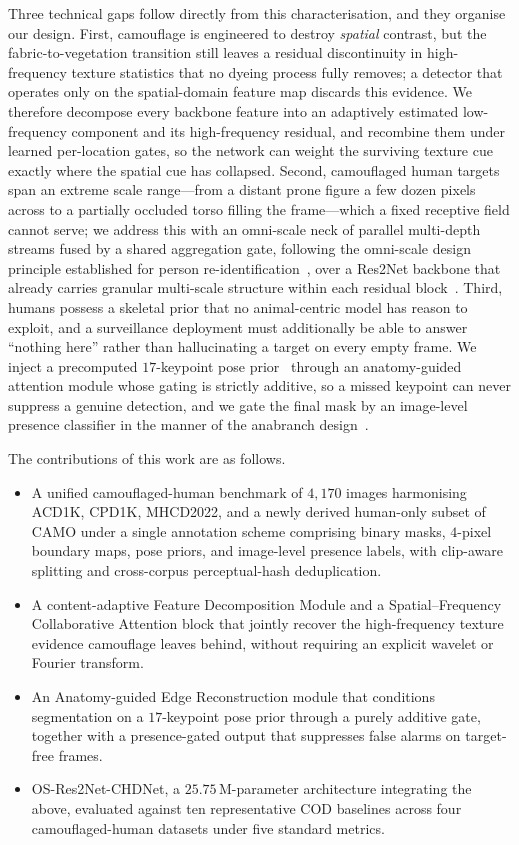 \documentclass[3p,times,procedia]{elsarticle}
\begin{document}
Three technical gaps follow directly from this characterisation, and they organise our design. First, camouflage is engineered to destroy \emph{spatial} contrast, but the fabric-to-vegetation transition still leaves a residual discontinuity in high-frequency texture statistics that no dyeing process fully removes; a detector that operates only on the spatial-domain feature map discards this evidence. We therefore decompose every backbone feature into an adaptively estimated low-frequency component and its high-frequency residual, and recombine them under learned per-location gates, so the network can weight the surviving texture cue exactly where the spatial cue has collapsed. Second, camouflaged human targets span an extreme scale range---from a distant prone figure a few dozen pixels across to a partially occluded torso filling the frame---which a fixed receptive field cannot serve; we address this with an omni-scale neck of parallel multi-depth streams fused by a shared aggregation gate, following the omni-scale design principle established for person re-identification~\cite{osnet}, over a Res2Net backbone that already carries granular multi-scale structure within each residual block~\cite{res2net}. Third, humans possess a skeletal prior that no animal-centric model has reason to exploit, and a surveillance deployment must additionally be able to answer ``nothing here'' rather than hallucinating a target on every empty frame. We inject a precomputed $17$-keypoint pose prior~\cite{coco} through an anatomy-guided attention module whose gating is strictly additive, so a missed keypoint can never suppress a genuine detection, and we gate the final mask by an image-level presence classifier in the manner of the anabranch design~\cite{camo}.

The contributions of this work are as follows.
\begin{itemize}
\item A unified camouflaged-human benchmark of $4{,}170$ images harmonising ACD1K, CPD1K, MHCD2022, and a newly derived human-only subset of CAMO under a single annotation scheme comprising binary masks, $4$-pixel boundary maps, pose priors, and image-level presence labels, with clip-aware splitting and cross-corpus perceptual-hash deduplication.
\item A content-adaptive Feature Decomposition Module and a Spatial--Frequency Collaborative Attention block that jointly recover the high-frequency texture evidence camouflage leaves behind, without requiring an explicit wavelet or Fourier transform.
\item An Anatomy-guided Edge Reconstruction module that conditions segmentation on a $17$-keypoint pose prior through a purely additive gate, together with a presence-gated output that suppresses false alarms on target-free frames.
\item OS-Res2Net-CHDNet, a $25.75$\,M-parameter architecture integrating the above, evaluated against ten representative COD baselines across four camouflaged-human datasets under five standard metrics.
\end{itemize}
\end{document}
